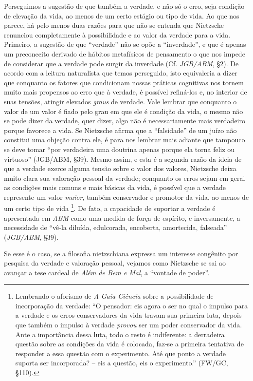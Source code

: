 \documentclass[
	12pt,				%
	openright,			%
	oneside,			%
	a4paper,			%
	english,			%
	french,				%
	spanish,			%
	brazil				%
	]{abntex2}
\begin{document}
Perseguimos a sugestão de que também a verdade, e não só o erro, seja condição de elevação da vida, ao menos de um certo estágio ou tipo de vida. Ao que nos parece, há pelo menos duas razões para que não se entenda que Nietzsche renunciou completamente à possibilidade e ao valor da verdade para a vida. Primeiro, a sugestão de que “verdade” não se opõe a “inverdade”, e que é apenas um preconceito derivado de hábitos metafísicos de pensamento o que nos impede de considerar que a verdade pode surgir da inverdade (Cf. \textit{JGB/ABM}, §2). De acordo com a leitura naturalista que temos perseguido, isto equivaleria a dizer que conquanto os fatores que condicionam nossas práticas cognitivas nos tornem muito mais propensos ao erro que à verdade, é possível refiná-los e, no interior de suas tensões, atingir elevados \textit{graus} de verdade. Vale lembrar que conquanto o valor de um valor é fiado pelo grau em que ele é condição da vida, o mesmo não se pode dizer da verdade, quer dizer, algo não é necessariamente mais verdadeiro porque favorece a vida. Se Nietzsche afirma que a “falsidade” de um juízo não constitui uma objeção contra ele, é para nos lembrar mais adiante que tampouco se deve tomar “por verdadeira uma doutrina apenas porque ela torna feliz ou virtuoso” (JGB/ABM, §39). Mesmo assim, e esta é a segunda razão da ideia de que a verdade exerce alguma tensão sobre o valor dos valores, Nietzsche deixa muito clara sua valoração pessoal da verdade; conquanto os erros sejam em geral as condições mais comuns e mais básicas da vida, é possível que a verdade represente um valor \textit{maior}, também conservador e promotor da vida, ao menos de um certo tipo de vida
\footnote{Lembrando o aforismo de \textit{A Gaia Ciência} sobre a possibilidade de incorporação da verdade: “O pensador: eis agora o ser no qual o impulso para a verdade e os erros conservadores da vida travam sua primeira luta, depois que também o impulso à verdade \textit{provou} ser um poder conservador da vida. Ante a importância dessa luta, todo o resto é indiferente: a derradeira questão sobre as condições da vida é colocada, faz-se a primeira tentativa de responder a essa questão com o experimento. Até que ponto a verdade suporta ser incorporada? – eis a questão, eis o experimento.” (FW/GC, §110).  }. 
 De fato, a capacidade de suportar a verdade é apresentada em \textit{ABM} como uma medida de força de espírito, e inversamente, a necessidade de “vê-la diluída, edulcorada, encoberta, amortecida, falseada” (\textit{JGB/ABM}, §39).

	Se esse é o caso, se a filosofia nietzschiana expressa um interesse congênito por pesquisa da verdade e valoração pessoal, vejamos como Nietzsche se sai ao avançar a tese cardeal de \textit{Além de Bem e Mal}, a “vontade de poder”.
\end{document}
